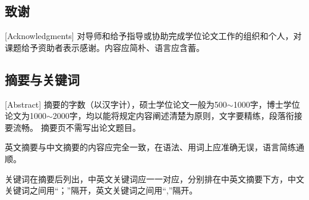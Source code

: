 
\subsection{致谢}[Acknowledgments]
对导师和给予指导或协助完成学位论文工作的组织和个人，对课题给予资助者表示感谢。内容应简朴、语言应含蓄。









\subsection{摘要与关键词}[Abstract]
摘要的字数（以汉字计），硕士学位论文一般为500$\sim$\num{1000}字，博士学位论文为\num{1000}$\sim$\num{2000}字，均以能将规定内容阐述清楚为原则，文字要精练，段落衔接要流畅。
摘要页不需写出论文题目。

英文摘要与中文摘要的内容应完全一致，在语法、用词上应准确无误，语言简练通顺。


关键词在摘要后列出，中英文关键词应一一对应，分别排在中英文摘要下方，中文关键词之间用“；”隔开，英文关键词之间用“,”隔开。


